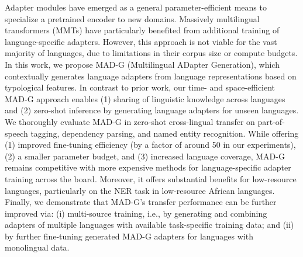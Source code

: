 Adapter modules have emerged as a general parameter-efficient means to specialize a pretrained encoder to new domains. Massively multilingual transformers (MMTs) have particularly benefited from additional training of language-specific adapters. However, this approach is not viable for the vast majority of languages, due to limitations in their corpus size or compute budgets. In this work, we propose MAD-G (Multilingual ADapter Generation), which contextually generates language adapters from language representations based on typological features. In contrast to prior work, our time- and space-efficient MAD-G approach enables (1) sharing of linguistic knowledge across languages and (2) zero-shot inference by generating language adapters for unseen languages. We thoroughly evaluate MAD-G in zero-shot cross-lingual transfer on part-of-speech tagging, dependency parsing, and named entity recognition. While offering (1) improved fine-tuning efficiency (by a factor of around 50 in our experiments), (2) a smaller parameter budget, and (3) increased language coverage, MAD-G remains competitive with more expensive methods for language-specific adapter training across the board. Moreover, it offers substantial benefits for low-resource languages, particularly on the NER task in low-resource African languages. Finally, we demonstrate that MAD-G's transfer performance can be further improved via: (i) multi-source training, i.e., by generating and combining adapters of multiple languages with available task-specific training data; and (ii) by further fine-tuning generated MAD-G adapters for languages with monolingual data.
